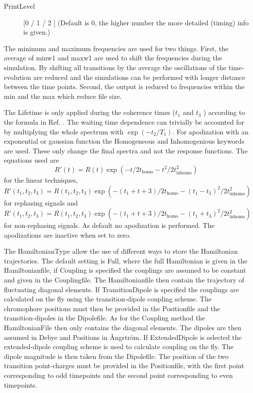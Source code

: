 \begin{description}
\item [PrintLevel] [0 / 1 / 2 ] (Default is 0, the higher number the more detailed (timing) info is given.)
\end{description}

The minimum and maximum frequencies are used for two things. First, the average of minw1 and maxw1 are used to shift the frequencies during the simulation. By shifting all transitions by the
average the oscillations of the time-evolution are reduced and the simulations can be performed with
longer distance between the time points. Second, the output is reduced to frequencies within the
min and the max which reduce file size.

The Lifetime is only applied during the coherence times ($t_1$ and $t_3$ ) according 
to the formula in Ref. . The waiting time dependence can trivially be accounted for by 
multiplying the whole spectrum with $\exp( -t_2 /T_1 )$. For apodization with an exponential or gaussian function the Homogeneous and Inhomogenious keywords are used. These only change the final spectra and not the response functions. The equations used are
\begin{equation}
R'(t)=R(t)\exp\left(-t/2 t_{\textrm{homo}}-t^2/2 t_{\textrm{inhomo}}^2\right)
\end{equation}
for the linear techniques,
\begin{equation}
R'(t_1,t_2,t_3)=R(t_1,t_2,t_3)\exp\left(-(t_1+t+3)/2 t_{\textrm{homo}}-(t_1-t_3)^2/2 t_{\textrm{inhomo}}^2\right)
\end{equation}
for rephasing signals and
\begin{equation}
R'(t_1,t_2,t_3)=R(t_1,t_2,t_3)
\exp\left(-(t_1+t+3)/2 t_{\textrm{homo}}-(t_1+t_3)^2/2 t_{\textrm{inhomo}}^2\right)
\end{equation}
for non-rephasing signals. As default no apodization is performed. The apodizations are inactive when set to zero.  

The HamiltonianType allow the use of different ways to store the Hamiltonian trajectories. The default setting is Full, where the full Hamiltonian is given in the Hamiltonianfile, if Coupling is specified the couplings are assumed to be constant and given in the Couplingfile. The Hamiltonianfile then contain the trajectory of fluctuating diagonal elements. If TransitionDipole is specified the couplings are calculated on the fly using the transition-dipole coupling scheme. The chromophore positions must then be provided in the Positionfile and the transition-dipoles in the Dipolefile. As for the Coupling method the HamiltonianFile then only contains the diagonal elements. The dipoles are then assumed in Debye and Positions in \AA ngstr\"{o}m. If ExtendedDipole is selected the extended-dipole coupling scheme is used to calculate coupling on the fly. The dipole magnitude is then taken from the Dipolefile. The position of the two transition point-charges must be provided in the Positionfile, with the first point corresponding to odd timepoints and the second point corresponding to even timepoints.

